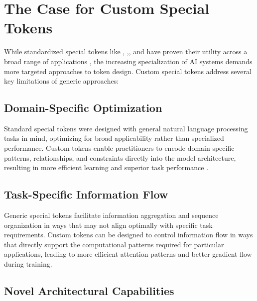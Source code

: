 \section{The Case for Custom Special Tokens}

While standardized special tokens like \cls{}, \sep{}, and \mask{} have proven their utility across a broad range of applications \citep{devlin2018bert, clark2019what}, the increasing specialization of AI systems demands more targeted approaches to token design. Custom special tokens address several key limitations of generic approaches:

\subsection{Domain-Specific Optimization}

Standard special tokens were designed with general natural language processing tasks in mind, optimizing for broad applicability rather than specialized performance. Custom tokens enable practitioners to encode domain-specific patterns, relationships, and constraints directly into the model architecture, resulting in more efficient learning and superior task performance \citep{rogers2020primer}.
\begin{comment}
Feedback: A concrete example would make this much stronger. For instance: "For example, a standard [SEP] token treats all boundaries equally, but in a legal document, the boundary between a 'clause' and a 'sub-clause' has a specific hierarchical meaning. A custom `<CLAUSE_END>` token can be trained to specifically capture this legal structure, leading to better document understanding."
\end{comment}

\subsection{Task-Specific Information Flow}

Generic special tokens facilitate information aggregation and sequence organization in ways that may not align optimally with specific task requirements. Custom tokens can be designed to control information flow in ways that directly support the computational patterns required for particular applications, leading to more efficient attention patterns and better gradient flow during training.

\subsection{Novel Architectural Capabilities}

